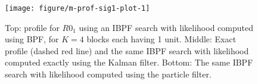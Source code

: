 \documentclass[12pt]{article}\usepackage[]{graphicx}\usepackage[]{xcolor}
\newenvironment{knitrout}{}{} %
\begin{document}
\begin{knitrout}
\color{fgcolor}\begin{figure}

\texttt{[image: figure/m-prof-sig1-plot-1]} \hfill{}

\caption[Top]{Top: profile for $R0_1$ using an IBPF search with likelihood computed using BPF, for $K=4$ blocks each having 1 unit. Middle: Exact profile (dashed red line) and the same IBPF search with likelihood computed exactly using the Kalman filter. Bottom: The same IBPF search with likelihood computed using the particle filter.}\label{fig:m-prof-sig1-plot}
\end{figure}

\end{knitrout}



\end{document}

